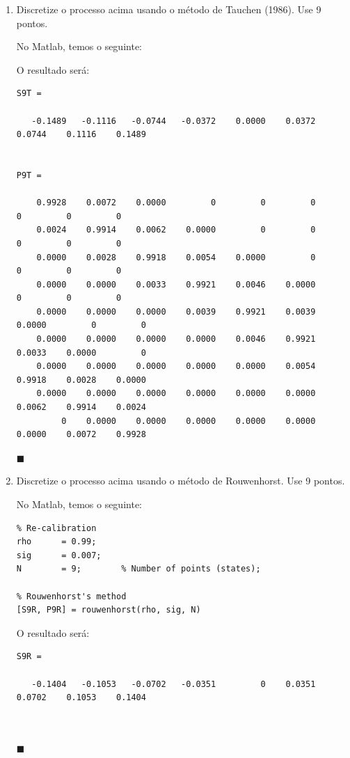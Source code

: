\documentclass[10pt]{article}
\newcommand*{\QEDA}{\hfill\ensuremath{\blacksquare}}%
\newcommand\0{\mathbf{0}}
\newenvironment{sol}
    {\\[1em] {\color{magenta}\text{Resposta.}}
    }
    {{\color{blue!50!black}\QEDA}}
\begin{document}
\begin{enumerate}[label = 5.\arabic*., wide]

\item Discretize o processo acima usando o método de Tauchen (1986). Use
9 pontos.
\begin{sol}
No Matlab, temos o seguinte: \vspace{-0.4cm}

O resultado será: \vspace{-0.4cm}
\begin{lstlisting}
S9T =

   -0.1489   -0.1116   -0.0744   -0.0372    0.0000    0.0372    0.0744    0.1116    0.1489


P9T =

    0.9928    0.0072    0.0000         0         0         0         0         0         0
    0.0024    0.9914    0.0062    0.0000         0         0         0         0         0
    0.0000    0.0028    0.9918    0.0054    0.0000         0         0         0         0
    0.0000    0.0000    0.0033    0.9921    0.0046    0.0000         0         0         0
    0.0000    0.0000    0.0000    0.0039    0.9921    0.0039    0.0000         0         0
    0.0000    0.0000    0.0000    0.0000    0.0046    0.9921    0.0033    0.0000         0
    0.0000    0.0000    0.0000    0.0000    0.0000    0.0054    0.9918    0.0028    0.0000
    0.0000    0.0000    0.0000    0.0000    0.0000    0.0000    0.0062    0.9914    0.0024
         0    0.0000    0.0000    0.0000    0.0000    0.0000    0.0000    0.0072    0.9928
\end{lstlisting}
\end{sol}

\item Discretize o processo acima usando o método de Rouwenhorst. Use 9
pontos.
\begin{sol}
No Matlab, temos o seguinte: \vspace{-0.4cm}
\begin{lstlisting}
% Re-calibration
rho      = 0.99;                         
sig      = 0.007;         
N        = 9;        % Number of points (states);  

% Rouwenhorst's method
[S9R, P9R] = rouwenhorst(rho, sig, N)
\end{lstlisting}
O resultado será: \vspace{-0.4cm}
\begin{lstlisting}
S9R =

   -0.1404   -0.1053   -0.0702   -0.0351         0    0.0351    0.0702    0.1053    0.1404



\end{lstlisting}
\end{sol}
\end{enumerate}
\end{document}
